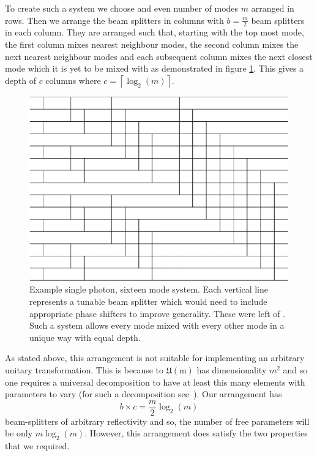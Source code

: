 \documentclass[aps,pra,twocolumn,superscriptaddress,numerical,floatfix]{revtex4-1}
\begin{document}
To create such a system we choose and even number of modes $m$ arranged in rows. Then we arrange the beam splitters in columns with $b=\frac{m}{2}$ beam splitters in each column. They are arranged such that, starting with the top most mode, the first column mixes nearest neighbour modes, the second column mixes the next nearest neighbour modes and each subsequent column mixes the next closest mode which it is yet to be mixed with as demonstrated in figure \ref{fig:16 mode single photon unitary}. This gives a depth of $c$ columns where $c=\left\lceil \log_{2}(m)\right\rceil $.

\begin{figure}[h]
	\centerline{\includegraphics[width=\columnwidth]{16mode_single_photon_unitary.pdf}}
	\caption{Example single photon, sixteen mode system. Each vertical line represents a tunable beam splitter which would need to include appropriate phase shifters to improve generality. These were left of . Such a system allows every mode mixed with every other mode in a unique way with equal depth. \label{fig:16 mode single photon unitary}}
\end{figure}

As stated above, this arrangement is not suitable for implementing an arbitrary unitary transformation. This is because to $\mathfrak{U\mathrm{(m)}}$ has dimensionality $m^2$ and so one requires a universal decomposition to have at least this many elements with parameters to vary (for such a decomposition see~\cite{reck}). Our arrangement has
\begin{equation}
b\times c=\frac{m}{2}\log_{2}(m)
\end{equation}
beam-splitters of arbitrary reflectivity and so, the number of free parameters will be only $m\log_{2}(m)$.  However, this arrangement does satisfy the two properties that we required.
\end{document}
